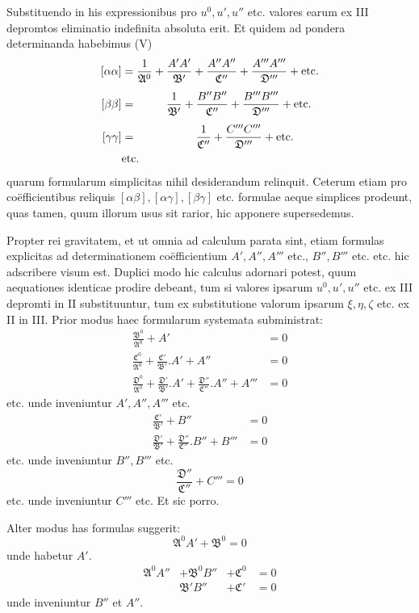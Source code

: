 Substituendo in his expressionibus pro \(u^0,u',u''\) etc. valores earum ex III depromtos eliminatio indefinita absoluta erit. Et quidem ad pondera determinanda habebimus (V)
\[
\begin{aligned}
\relax[\alpha\alpha]&=\frac1{\mathfrak{A}^0}+\frac{A'A'}{\mathfrak{B}'}+\frac{A''A''}{\mathfrak{C}''}+\frac{A'''A'''}{\mathfrak{D}'''}+\text{etc.}\\[4pt]
[\beta\beta]&=\phantom{\frac1{\mathfrak{A}^0}+{}}\frac1{\mathfrak{B}'}+\frac{B''B''}{\mathfrak{C}''}+\frac{B'''B'''}{\mathfrak{D}'''}+\text{etc.}\\[4pt]
[\gamma\gamma]&=\phantom{\frac1{\mathfrak{A}^0}+\frac1{\mathfrak{B}'}+{}}\frac1{\mathfrak{C}''}+\frac{C'''C'''}{\mathfrak{D}'''}+\text{etc.}\\
&\text{etc.}
\end{aligned}
\]
quarum formularum simplicitas nihil desiderandum relinquit. Ceterum etiam pro
%
coëfficientibus reliquis \([\alpha\beta],[\alpha\gamma],[\beta\gamma]\) etc. formulae aeque simplices prodeunt, quas tamen, quum illorum usus sit rarior, hic apponere supersedemus.

Propter rei gravitatem, et ut omnia ad calculum parata sint, etiam formulas explicitas ad determinationem coëfficientium \(A',A'',A'''\) etc., \(B'',B'''\) etc. etc. hic adscribere visum est. Duplici modo hic calculus adornari potest, quum aequationes identicae prodire debeant, tum si valores ipsarum \(u^0,u',u''\) etc. ex III depromti in II substituuntur, tum ex substitutione valorum ipsarum \(\xi,\eta,\zeta\) etc. ex II in III. Prior modus haec formularum systemata subministrat:
\[
\begin{aligned}
\frac{\mathfrak{B}^0}{\mathfrak{A}^0}+A'&=0\\[4pt]
\frac{\mathfrak{C}^0}{\mathfrak{A}^0}+\frac{\mathfrak{C}'}{\mathfrak{B}'}.A'+A''&=0\\[4pt]
\frac{\mathfrak{D}^0}{\mathfrak{A}^0}+\frac{\mathfrak{D}'}{\mathfrak{B}'}.A'+\frac{\mathfrak{D}''}{\mathfrak{C}''}.A''+A'''&=0
\end{aligned}
\]
etc. unde inveniuntur \(A',A'',A'''\) etc.
\[
\begin{aligned}
\frac{\mathfrak{C}'}{\mathfrak{B}'}+B''&=0\\[4pt]
\frac{\mathfrak{D}'}{\mathfrak{B}'}+\frac{\mathfrak{D}''}{\mathfrak{C}''}.B''+B'''&=0
\end{aligned}
\]
etc. unde inveniuntur \(B'',B'''\) etc.
\[
\frac{\mathfrak{D}''}{\mathfrak{C}''}+C'''=0
\]
etc. unde inveniuntur \(C'''\) etc. Et sic porro.

Alter modus has formulas suggerit:
\[
\mathfrak{A}^0A'+\mathfrak{B}^0=0
\]
unde habetur \(A'\).
\[
\begin{array}{rllll}
\mathfrak{A}^0A''&+\mathfrak{B}^0B''&+\mathfrak{C}^0&=0\\
&\mathfrak{B}'B''&+\mathfrak{C}'&=0
\end{array}
\]
unde inveniuntur \(B''\) et \(A''\).
